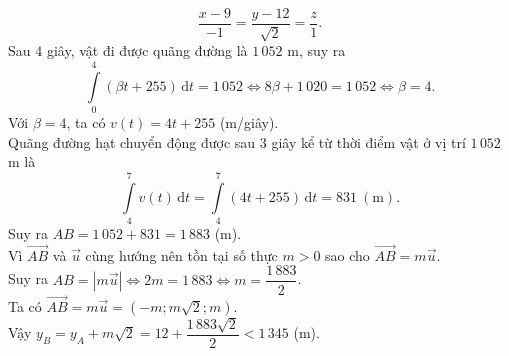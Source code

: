 \begin{ex}
{\begin{itemchoice}
			$$\dfrac{x-9}{-1}=\dfrac{y-12}{\sqrt{2}}=\dfrac{z}{1}.$$
			\itemch Sau $4$ giây, vật đi được quãng đường là $1\,052$ m, suy ra
			$$\displaystyle\int\limits_{0}^{4} (\beta t+255)\mathrm{\,d}t=1\,052 \Leftrightarrow 8\beta+1\,020=1\,052 \Leftrightarrow \beta=4.$$
			\itemch Với $\beta=4$, ta có $v(t)=4t+255$ (m/giây). \\
			Quãng đường hạt chuyển động được sau $3$ giây kể từ thời điểm vật ở vị trí $1\,052$ m là
			$$\displaystyle\int\limits_{4}^{7} v(t)\mathrm{\,d}t=\displaystyle\int\limits_{4}^{7} (4t+255)\mathrm{\,d}t=831 \ (\text{m}).$$
			Suy ra $AB=1\,052+831=1\,883$ (m). \\
			Vì $\overrightarrow{AB}$ và $\overrightarrow{u}$ cùng hướng nên tồn tại số thực $m>0$ sao cho $\overrightarrow{AB}=m\overrightarrow{u}$. \\
			Suy ra $AB=\left|m\overrightarrow{u}\right| \Leftrightarrow 2m=1\,883 \Leftrightarrow m=\dfrac{1\,883}{2}$. \\
			Ta có $\overrightarrow{AB}=m\overrightarrow{u}=\left(-m;m\sqrt{2};m\right)$. \\
			Vậy $y_B=y_A+m\sqrt{2}=12+\dfrac{1\,883\sqrt{2}}{2}<1\,345$ (m).
		\end{itemchoice}
	}
\end{ex}

